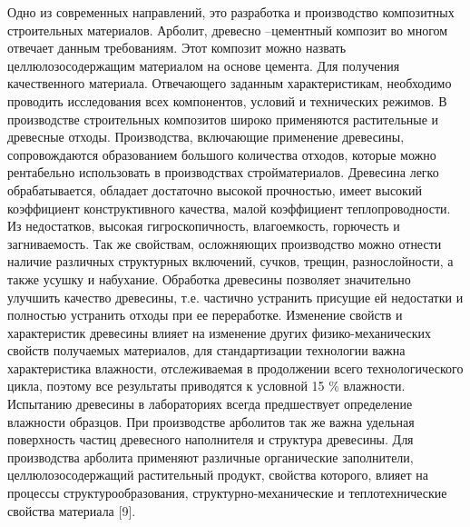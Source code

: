 Одно из современных направлений, это разработка и производство
композитных строительных материалов. Арболит, древесно --цементный
композит во многом отвечает данным требованиям. Этот композит можно
назвать целлюлозосодержащим материалом на основе цемента. Для получения
качественного материала. Отвечающего заданным характеристикам,
необходимо проводить исследования всех компонентов, условий и
технических режимов. В производстве строительных композитов широко
применяются растительные и древесные отходы. Производства, включающие
применение древесины, сопровождаются образованием большого количества
отходов, которые можно рентабельно использовать в производствах
стройматериалов. Древесина легко обрабатывается, обладает достаточно
высокой прочностью, имеет высокий коэффициент конструктивного качества,
малой коэффициент теплопроводности. Из недостатков, высокая
гигроскопичность, влагоемкость, горючесть и загниваемость. Так же
свойствам, осложняющих производство можно отнести наличие различных
структурных включений, сучков, трещин, разнослойности, а также усушку и
набухание. Обработка древесины позволяет значительно улучшить качество
древесины, т.е. частично устранить присущие ей недостатки и полностью
устранить отходы при ее переработке. Изменение свойств и характеристик
древесины влияет на изменение других физико-механических свойств
получаемых материалов, для стандартизации технологии важна
характеристика влажности, отслеживаемая в продолжении всего
технологического цикла, поэтому все результаты приводятся к условной 15
\% влажности. Испытанию древесины в лабораториях всегда предшествует
определение влажности образцов. При производстве арболитов так же важна
удельная поверхность частиц древесного наполнителя и структура
древесины. Для производства арболита применяют различные органические
заполнители, целлюлозосодержащий растительный продукт, свойства
которого, влияет на процессы структурообразования,
структурно-механические и теплотехнические свойства материала {[}9{]}.

